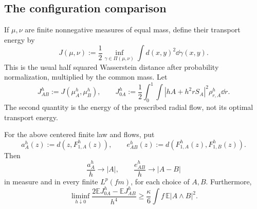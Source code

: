 \subsection{The configuration comparison}

If \(\mu,\nu\) are finite nonnegative measures of equal mass, define
their transport energy by
\[
 J(\mu,\nu):=\frac12
 \inf_{\gamma\in\Pi(\mu,\nu)}\int d(x,y)^2\dd\gamma(x,y).
\]
This is the usual half squared Wasserstein distance after probability
normalization, multiplied by the common mass. Let
\[
 J^h_{AB}:=J(\mu^h_A,\mu^h_B),\qquad
 J^h_{0A}:=\frac12\int_0^1\int
       |hA+h^2rS_A|^2\rho^h_{r,A}\dd r.
\]
The second quantity is the energy of the prescribed radial flow,
not its optimal transport energy.

\begin{lemma}
\label{fwd:configuration}
For the above centered finite law and flows, put
\[
 a^h_A(z):=d(z,F^h_{1,A}(z)),\qquad
 e^h_{AB}(z):=d(F^h_{1,A}(z),F^h_{1,B}(z)).
\]
Then
\begin{equation}
\label{fwd:distance-first}
 \frac{a^h_A}{h}\longrightarrow |A|,\qquad
 \frac{e^h_{AB}}h\longrightarrow |A-B|
\end{equation}
in measure and in every finite \(L^p(fm)\), for each choice of
\(A,B\). Furthermore,
\begin{equation}
\label{fwd:energy-comparison}
 \liminf_{h\downarrow0}
 \frac{2\mathbb E J^h_{0A}-\mathbb E J^h_{AB}}{h^4}
 \geq\frac\kappa6\int f\,\mathbb E|A\wedge B|^2.
\end{equation}
\end{lemma}


